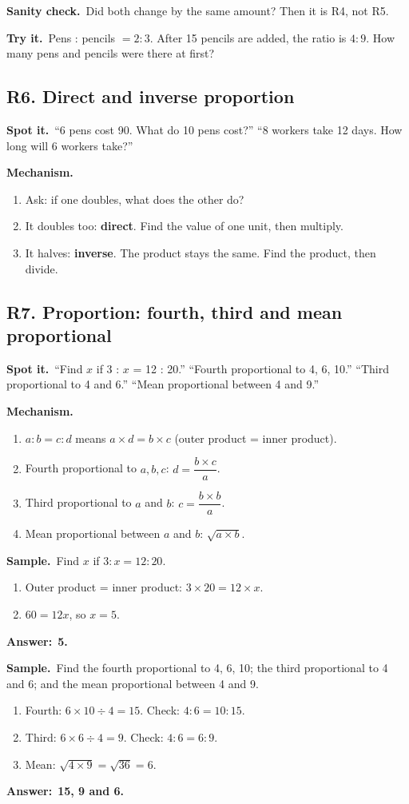 \documentclass[11pt,a4paper]{article}
\let\oldsubsection\subsection
\renewcommand{\subsection}{\needspace{9\baselineskip}\oldsubsection}
\newcommand{\spot}{\textbf{\color{ember}Spot it.}\ }
\newcommand{\mech}{\textbf{\color{ember}Mechanism.}\ }
\newif\ifkeepsamp
\newcommand{\ans}[1]{\par\nopagebreak\noindent\textbf{\color{ember}Answer:}\ \textbf{#1}\par}
\newcommand{\samp}{\ifkeepsamp\needspace{4\baselineskip}\fi\textbf{\color{ember}Sample.}\ }
\newcommand{\sane}{\textbf{\color{slate}Sanity check.}\ }
\newcommand{\tryit}[1]{\textbf{\color{ember}Try it.}\ #1}
\begin{document}
\sane Did both change by the same amount? Then it is R4, not R5.

\tryit Pens : pencils $= 2 : 3$. After 15 pencils are added, the ratio is $4 : 9$. How many pens and pencils were there at first?

\subsection{R6. Direct and inverse proportion}
\spot ``6 pens cost 90. What do 10 pens cost?'' ``8 workers take 12 days. How long will 6 workers take?''

\mech
\begin{enumerate}
\item Ask: if one doubles, what does the other do?
\item It doubles too: \textbf{direct}. Find the value of one unit, then multiply.
\item It halves: \textbf{inverse}. The product stays the same. Find the product, then divide.
\end{enumerate}

\subsection{R7. Proportion: fourth, third and mean proportional}
\spot ``Find $x$ if 3 : $x$ = 12 : 20.'' ``Fourth proportional to 4, 6, 10.'' ``Third proportional to 4 and 6.'' ``Mean proportional between 4 and 9.''

\mech
\begin{enumerate}
\item $a : b = c : d$ means $a \times d = b \times c$ (outer product = inner product).
\item Fourth proportional to $a, b, c$: $d = \dfrac{b \times c}{a}$.
\item Third proportional to $a$ and $b$: $c = \dfrac{b \times b}{a}$.
\item Mean proportional between $a$ and $b$: $\sqrt{a \times b}$.
\end{enumerate}

\samp Find $x$ if $3 : x = 12 : 20$.
\begin{enumerate}
\item Outer product = inner product: $3 \times 20 = 12 \times x$.
\item $60 = 12x$, so $x = 5$.
\end{enumerate}
\ans{5.}

\samp Find the fourth proportional to 4, 6, 10; the third proportional to 4 and 6; and the mean proportional between 4 and 9.
\begin{enumerate}
\item Fourth: $6 \times 10 \div 4 = 15$. Check: $4 : 6 = 10 : 15$.
\item Third: $6 \times 6 \div 4 = 9$. Check: $4 : 6 = 6 : 9$.
\item Mean: $\sqrt{4 \times 9} = \sqrt{36} = 6$.
\end{enumerate}
\ans{15, 9 and 6.}
\end{document}
